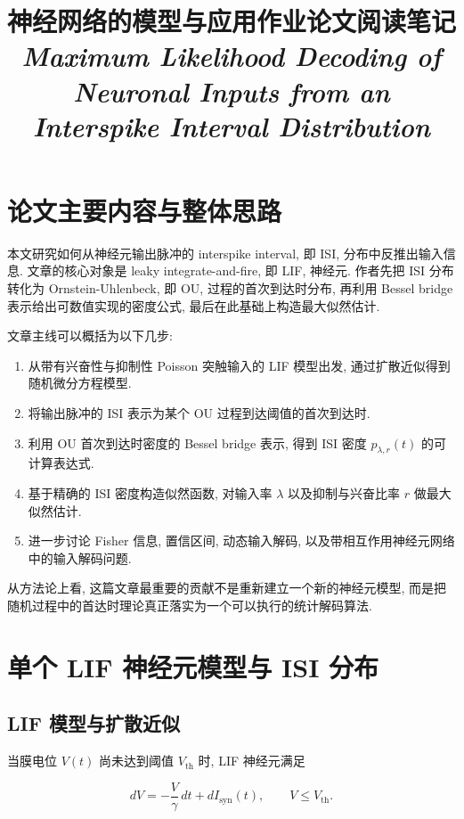 \documentclass[oneside]{ctexart}
\title{神经网络的模型与应用作业论文阅读笔记\\[0.6ex]
\large \textit{Maximum Likelihood Decoding of Neuronal Inputs from an Interspike Interval Distribution}}
\author{}
\date{}
\begin{document}
\maketitle

\section{论文主要内容与整体思路}

本文研究如何从神经元输出脉冲的 interspike interval, 即 ISI, 分布中反推出输入信息. 文章的核心对象是 leaky integrate-and-fire, 即 LIF, 神经元. 作者先把 ISI 分布转化为 Ornstein-Uhlenbeck, 即 OU, 过程的首次到达时分布, 再利用 Bessel bridge 表示给出可数值实现的密度公式, 最后在此基础上构造最大似然估计.

文章主线可以概括为以下几步:

\begin{enumerate}[(1)]
    \item 从带有兴奋性与抑制性 Poisson 突触输入的 LIF 模型出发, 通过扩散近似得到随机微分方程模型.
    \item 将输出脉冲的 ISI 表示为某个 OU 过程到达阈值的首次到达时.
    \item 利用 OU 首次到达时密度的 Bessel bridge 表示, 得到 ISI 密度 $p_{\lambda,r}(t)$ 的可计算表达式.
    \item 基于精确的 ISI 密度构造似然函数, 对输入率 $\lambda$ 以及抑制与兴奋比率 $r$ 做最大似然估计.
    \item 进一步讨论 Fisher 信息, 置信区间, 动态输入解码, 以及带相互作用神经元网络中的输入解码问题.
\end{enumerate}

从方法论上看, 这篇文章最重要的贡献不是重新建立一个新的神经元模型, 而是把随机过程中的首达时理论真正落实为一个可以执行的统计解码算法.

\section{单个 LIF 神经元模型与 ISI 分布}

\subsection{LIF 模型与扩散近似}

当膜电位 $V(t)$ 尚未达到阈值 $V_{\mathrm{th}}$ 时, LIF 神经元满足

\begin{equation}
    dV=-\dfrac{V}{\gamma}\,dt+dI_{\mathrm{syn}}(t), \qquad V\leq V_{\mathrm{th}}.
\end{equation}
\end{document}
